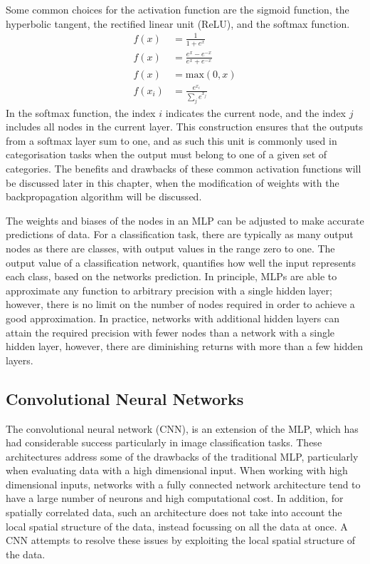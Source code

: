 Some common choices for the activation function are the sigmoid function, the
hyperbolic tangent, the rectified linear unit (ReLU), and the softmax 
function\cite{Lecun2015, He2015, Szegedy2015}.
\begin{align*}
	\tag{Sigmoid} f(x) &= \frac{1}{1+e^x} \\
	\tag{Tanh}    f(x) &= \frac{e^x - e^{-x}}{e^x+e^{-x}} \\
	\tag{ReLU}    f(x) &= \mbox{max}\left( 0, x \right) \\
	\tag{Softmax} f(x_i) &= \frac{e^{x_i}}{\displaystyle\sum_j e^{x_j}}
\end{align*}
In the softmax function, the index $i$ indicates the current node, and the index
$j$ includes all nodes in the current layer. This construction ensures that 
the outputs from a softmax layer sum to one, and as such this unit is commonly 
used in categorisation tasks when the output must belong to one of a given set 
of categories. The benefits and drawbacks of these common activation functions 
will be discussed later in this chapter, when the modification of weights 
with the backpropagation algorithm will be discussed.

The weights and biases of the nodes in an MLP can be adjusted to make accurate 
predictions of data. For a classification task, there are typically as many
output nodes as there are classes, with output values in the range zero to one. 
The output value of a classification network, quantifies how well the input
represents each class, based on the networks prediction. In principle, MLPs 
are able to approximate any function to arbitrary precision with a 
single hidden layer\cite{Cybenko1989ApproximationBS}; however, there is no 
limit on the number of nodes required in order to achieve a good 
approximation. In practice, networks with additional hidden layers can attain 
the required precision with fewer nodes than a network with a single hidden 
layer, however, there are diminishing returns with more than a few hidden 
layers\cite{Reed1999, Lecun2015}.

\subsection{Convolutional Neural Networks}
The convolutional neural network (CNN)\cite{Jackel2008, Szegedy2015, 5537907}, 
is an extension of the MLP, which has had considerable success particularly in 
image classification tasks. These architectures address some of the drawbacks 
of the traditional MLP, particularly when evaluating data with a high 
dimensional input. When working with high dimensional inputs, networks with a 
fully connected network architecture tend to have a large number of neurons 
and high computational cost. In addition, for spatially correlated data, such 
an architecture does not take into account the local spatial structure of the 
data, instead focussing on all the data at once. A CNN attempts to resolve 
these issues by exploiting the local spatial structure of the data.

